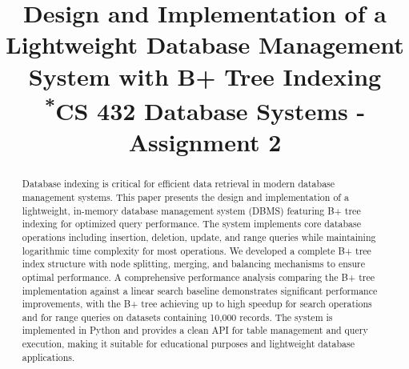 \documentclass[conference]{IEEEtran}
\begin{document}
\title{Design and Implementation of a Lightweight Database Management System with B+ Tree Indexing\\
{\footnotesize \textsuperscript{*}CS 432 Database Systems - Assignment 2}
}

\author{
}

\maketitle

\begin{abstract}
Database indexing is critical for efficient data retrieval in modern database management systems. This paper presents the design and implementation of a lightweight, in-memory database management system (DBMS) featuring B+ tree indexing for optimized query performance. The system implements core database operations including insertion, deletion, update, and range queries while maintaining logarithmic time complexity for most operations. We developed a complete B+ tree index structure with node splitting, merging, and balancing mechanisms to ensure optimal performance. A comprehensive performance analysis comparing the B+ tree implementation against a linear search baseline demonstrates significant performance improvements, with the B+ tree achieving up to high speedup for search operations and for range queries on datasets containing 10,000 records. The system is implemented in Python and provides a clean API for table management and query execution, making it suitable for educational purposes and lightweight database applications.
\end{abstract}
\end{document}
